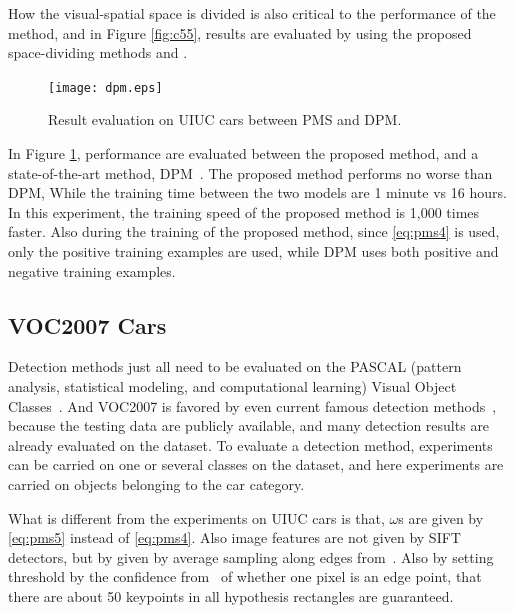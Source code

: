 How the visual-spatial space is divided is also critical to the performance of the method, and in Figure \ref{fig:c55}, results are evaluated by using the proposed space-dividing methods and \citep{pmk}.


\begin{figure}[!htbp]
\centering

\texttt{[image: dpm.eps]}


\caption[Result comparison with deformable part model~\citep{ac31}]{Result evaluation on UIUC cars between PMS and DPM.}
\label{fig:c56}
\end{figure}
\FloatBarrier


In Figure \ref{fig:c56}, performance are evaluated between the proposed method, and a state-of-the-art method, DPM~\citep{ac31}. The proposed method performs no worse than DPM,
While the training time between the two models are 1 minute vs 16 hours. In this experiment, the training speed of the proposed method is 1,000 times faster. Also during the training of the proposed method, since \ref{eq:pms4} is used, only the positive training examples are used, while DPM uses both positive and negative training examples.
\subsection{VOC2007 Cars}

Detection methods just all need to be evaluated on the PASCAL (pattern analysis, statistical modeling, and computational learning) Visual Object Classes~\citep{voc}. And VOC2007 is favored by even current famous detection methods~\citep{408}, because the testing data are publicly available, and many detection results are already evaluated on the dataset. To evaluate a detection method, experiments can be carried on one or several classes on the dataset, and here experiments are carried on objects belonging to the car category.

What is different from the experiments on UIUC cars is that, $\omega$s are given by \ref{eq:pms5} instead of \ref{eq:pms4}. Also image features are not given by SIFT detectors, but by given by average sampling along edges from~\citep{bdt}. Also by setting threshold by the confidence from~\citep{bdt} of whether one  pixel is an edge point, that there are about 50 keypoints in all hypothesis rectangles are guaranteed.

